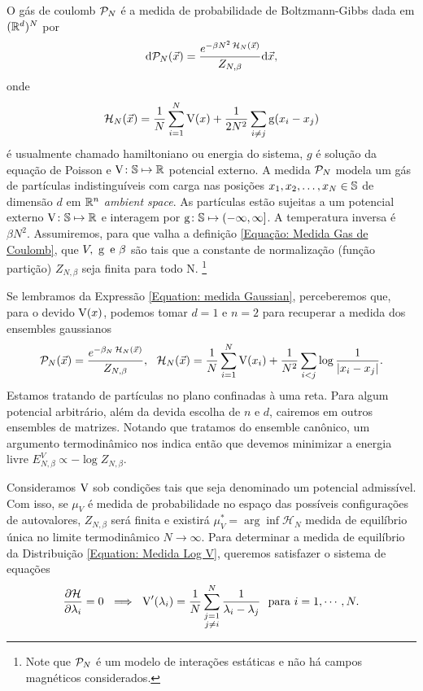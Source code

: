 \documentclass[12pt]{report}
\begin{document}
O gás de coulomb $\mathcal{P}_N$ é a medida de probabilidade de Boltzmann-Gibbs dada em $(\mathbb{R}^d)^N$ por 
\begin{equation}
	\mathrm{d} \mathcal{P}_N(\vec{x}) = \frac{e^{-\beta N^2 \operatorname{\mathcal{H}}_N(\vec{x})}}{Z_{N,\beta}} \mathrm{d} \vec{x},
	\label{Equação: Medida Gas de Coulomb}
\end{equation}
onde $$\operatorname{\mathcal{H}}_N(\vec{x}) = \frac{1}{N} \sum_{i = 1}^{N} \operatorname{V}(x) + \frac{1}{2N^2} \sum_{i \neq j} \operatorname{g}(x_i - x_j)$$ é usualmente chamado hamiltoniano ou energia do sistema, $g$ é solução da equação de Poisson e $\operatorname{V} \colon \mathbb{S} \mapsto \mathbb{R}$ potencial externo. \cite{ChafaCoulombMeasure} A medida $\mathcal{P}_N$ modela um gás de partículas indistinguíveis com carga nas posições $x_1, x_2, \dots, x_N \in \mathbb{S}$ de dimensão $d$ em $\mathbb{R}^n$ \textit{ambient space}. As partículas estão sujeitas a um potencial externo $\operatorname{V} \colon \mathbb{S} \mapsto \mathbb{R}$ e interagem por $\operatorname{g} \colon \mathbb{S} \mapsto (-\infty, \infty]$. A temperatura inversa é $\beta N^2$. Assumiremos, para que valha a definição \eqref{Equação: Medida Gas de Coulomb}, que $V, \ \g \ \text{e} \ \beta$ são tais que a constante de normalização (função partição) $Z_{N, \beta}$ seja finita para todo N. \footnote{Note que $\mathcal{P}_N$ é um modelo de interações estáticas e não há campos magnéticos considerados.}

Se lembramos da Expressão \eqref{Equation: medida Gaussian}, perceberemos que, para o devido $\operatorname{V}(x)$, podemos tomar $d=1$ e $n = 2$ para recuperar a medida dos ensembles gaussianos 
\begin{equation}
	\mathcal{P}_N(\vec{x}) = \frac{e^{-\beta_N \operatorname{\mathcal{H}}_N(\vec{x})}}{Z_{N,\beta}}, \ \ \operatorname{\mathcal{H}}_N(\vec{x}) = \frac{1}{N} \sum_{i = 1}^{N} \operatorname{V}(x_i) + \frac{1}{N^2} \sum_{i < j} \log{\frac{1}{|x_i - x_j|}}.
	\label{Equation: Medida Log V}
\end{equation}
Estamos tratando de partículas no plano confinadas à uma reta. Para algum potencial arbitrário, além da devida escolha de $n$ e $d$, cairemos em outros ensembles de matrizes. Notando que tratamos do ensemble canônico, um argumento termodinâmico nos indica então que devemos minimizar a energia livre $E^V_{N,\beta} \propto - \log{Z_{N, \beta}}.$

Consideramos $\operatorname{V}$ sob condições tais que seja denominado um potencial admissível. \cite{ChafaCoulombMeasure} Com isso, se $\mu_{V}$ é medida de probabilidade no espaço das possíveis configurações de autovalores, $Z_{N, \beta}$ será finita e existirá $\mu_{V}^* = \arg \inf {\mathcal{H}_N}$ medida de equilíbrio única no limite termodinâmico $N \rightarrow \infty$. Para determinar a medida de equilíbrio da Distribuição \eqref{Equation: Medida Log V}, \cite{RMT-firstcourse-Potters} queremos satisfazer o sistema de equações
\begin{equation}
	\frac{\partial \mathcal{H}}{\partial \lambda_i} = 0 \ \implies \ \operatorname{V}'(\lambda_i) = \frac{1}{N} \sum_{\substack{j=1 \\ j \neq i}}^{N} \frac{1}{\lambda_i - \lambda_j} \ \ \text{para} \ i = 1, \cdots, N.
	\label{Equação: Sistema minimizante}
\end{equation} 
\end{document}
